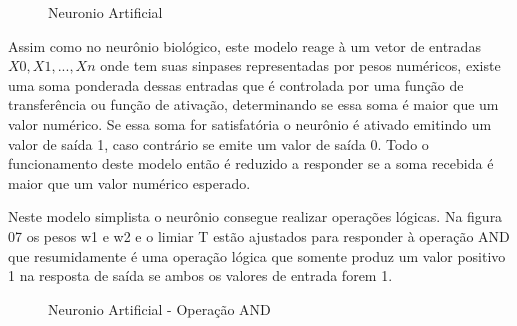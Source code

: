 \documentclass[	12pt, Times, openright, twoside, a4paper, english, brazil]{abntex2}
\begin{document}
            \begin{figure}[!ht]
                \caption{Neuronio Artificial\label{fig:NeuronioArtificial}}
            \end{figure}

            Assim como no neurônio biológico, este modelo reage à um vetor de entradas $X0,X1,...,Xn$ onde tem suas sinpases representadas por pesos numéricos, existe uma soma ponderada dessas entradas que é controlada por uma função de transferência ou função de ativação, determinando se essa soma é maior que um valor numérico. Se essa soma for satisfatória o neurônio é ativado emitindo um valor de saída 1, caso contrário se emite um valor de saída 0.
            Todo o funcionamento deste modelo então é reduzido a responder se a soma recebida é maior que um valor numérico esperado.

            Neste modelo simplista o neurônio consegue realizar operações lógicas. Na figura 07 os pesos w1 e w2 e o limiar T estão ajustados para responder à operação AND que resumidamente é uma operação lógica que somente produz um valor positivo 1 na resposta de saída se ambos os valores de entrada forem 1.

            \begin{figure}[!ht]
              \caption{Neuronio Artificial - Operação AND\label{fig:NeuronioArtificialAnd}}
            \end{figure}
\end{document}
